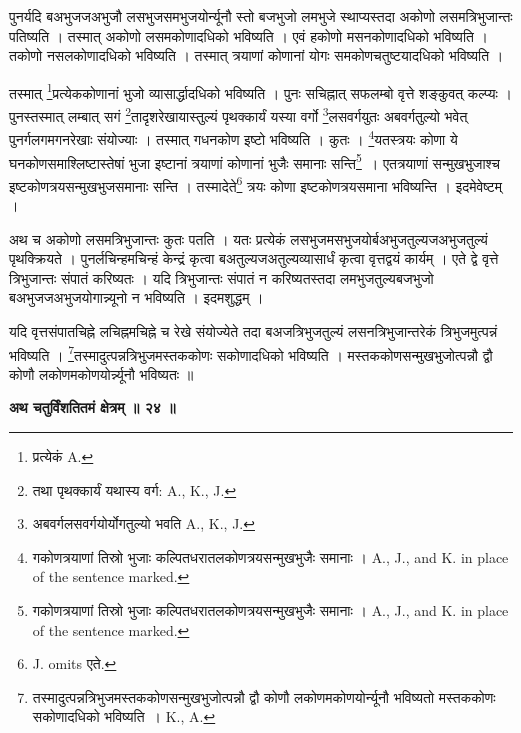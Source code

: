 \documentclass[11pt, openany]{book}
\begin{document}
पुनर्यदि बअभुजजअभुजौ लसभुजसमभुजयोर्न्यूनौ स्तो बजभुजो लमभुजे स्थाप्यस्तदा अकोणो लसमत्रिभुजान्तः पतिष्यति । तस्मात् अकोणो लसमकोणादधिको भविष्यति । एवं हकोणो मसनकोणादधिको भविष्यति । तकोणो नसलकोणादधिको भविष्यति । तस्मात् त्रयाणां कोणानां योगः समकोणचतुष्टयादधिको भविष्यति ।

\newpage
\noindent तस्मात् \renewcommand{\thefootnote}{१}\footnote{प्रत्येकं {\en A.} }प्रत्येककोणानां भुजो व्यासार्द्धादधिको भविष्यति । पुनः सचिह्नात् सफलम्बो वृत्ते शङ्कुवत् कल्प्यः । पुनस्तस्मात् लम्बात् सगं \renewcommand{\thefootnote}{२}\footnote{तथा पृथक्कार्यं यथास्य वर्ग: {\en A., K., J.}}तादृशरेखायास्तुल्यं पृथक्कार्यं यस्या वर्गो \renewcommand{\thefootnote}{३}\footnote{अबवर्गलसवर्गयोर्योगतुल्यो भवति {\en A., K., J.}}लसवर्गयुतः
अबवर्गतुल्यो भवेत् पुनर्गलगमगनरेखाः संयोज्याः । तस्मात् गधनकोण इष्टो भविष्यति । कुतः । \renewcommand{\thefootnote}{४}\footnote{गकोणत्रयाणां तिस्रो भुजाः कल्पितधरातलकोणत्रयसन्मुखभुजैः समानाः । {\en A., J., and K. in place of the sentence marked.} }यतस्त्रयः कोणा ये घनकोणसमाश्लिष्टास्तेषां भुजा इष्टानां त्रयाणां कोणानां भुजैः समानाः सन्ति\renewcommand{\thefootnote}{५}\footnote{गकोणत्रयाणां तिस्रो भुजाः कल्पितधरातलकोणत्रयसन्मुखभुजैः समानाः । {\en A., J., and K. in place of the sentence marked.} }~। एतत्रयाणां
सन्मुखभुजाश्च इष्टकोणत्रयसन्मुखभुजसमानाः सन्ति । तस्मादेते\renewcommand{\thefootnote}{६}\footnote{{\en J. omits} एते.} त्रयः
कोणा इष्टकोणत्रयसमाना भविष्यन्ति । इदमेवेष्टम् ।\\
\vspace{5mm}

 अथ च अकोणो लसमत्रिभुजान्तः कुतः पतति । यतः प्रत्येकं लसभुजमसभुजयोर्बअभुजतुल्यजअभुजतुल्यं पृथक्क्रियते । पुनर्लचिन्हमचिन्हं केन्द्रं कृत्वा बअतुल्यजअतुल्यव्यासार्धं कृत्वा वृत्तद्वयं कार्यम् । एते द्वे वृत्ते त्रिभुजान्तः संपातं करिष्यतः ।
यदि त्रिभुजान्तः संपातं न करिष्यतस्तदा लमभुजतुल्यबजभुजो
बअभुजजअभुजयोगान्न्यूनो न भविष्यति । इदमशुद्धम् । \\
\vspace{5mm}

यदि वृत्तसंपातचिह्ने लचिह्नमचिह्ने च रेखे संयोज्येते तदा बअजत्रिभुजतुल्यं लसनत्रिभुजान्तरेकं त्रिभुजमुत्पन्नं भविष्यति ।
\renewcommand{\thefootnote}{७}\footnote{तस्मादुत्पन्नत्रिभुजमस्तककोणसन्मुखभुजोत्पन्नौ द्वौ कोणौ लकोणमकोणयोर्न्यूनौ भविष्यतो
मस्तककोणः सकोणादधिको भविष्यति~। {\en K., A.}
}तस्मादुत्पन्नत्रिभुजमस्तककोणः सकोणादधिको भविष्यति । मस्तककोणसन्मुखभुजोत्पन्नौ द्वौ कोणौ लकोणमकोणयोर्न्न्यूनौ भविष्यतः ॥\\
\begin{center}
\textbf{\large अथ चतुर्विंशतितमं क्षेत्रम् ॥ २४ ॥}
\end{center}
\vspace{5mm}
\end{document}
